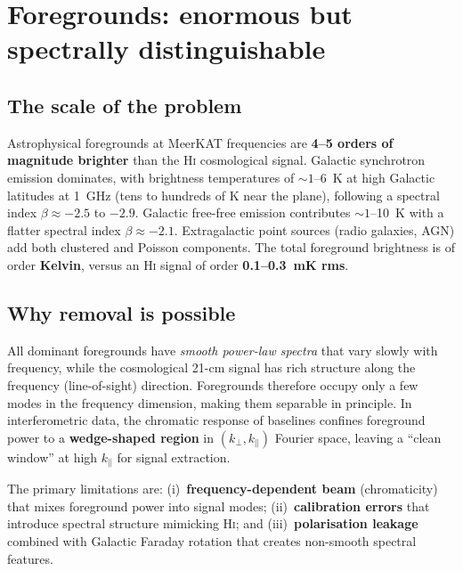 \documentclass[10pt,a4paper]{article}
\begin{document}
\section{Foregrounds: enormous but spectrally distinguishable}
\label{sec:foregrounds}

\subsection{The scale of the problem}

Astrophysical foregrounds at MeerKAT frequencies are \textbf{4--5 orders of
magnitude brighter} than the H\textsc{i} cosmological signal.  Galactic
synchrotron emission dominates, with brightness temperatures of $\sim\!1$--6~K
at high Galactic latitudes at 1~GHz (tens to hundreds of K near the plane),
following a spectral index $\beta \approx -2.5$ to $-2.9$.  Galactic free-free
emission contributes $\sim\!1$--10~K with a flatter spectral index
$\beta \approx -2.1$.  Extragalactic point sources (radio galaxies, AGN) add
both clustered and Poisson components.  The total foreground brightness is of
order \textbf{Kelvin}, versus an H\textsc{i} signal of order
\textbf{0.1--0.3~mK rms}.


\subsection{Why removal is possible}

All dominant foregrounds have \emph{smooth power-law spectra} that vary slowly
with frequency, while the cosmological 21-cm signal has rich structure along
the frequency (line-of-sight) direction.  Foregrounds therefore occupy only a
few modes in the frequency dimension, making them separable in principle.  In
interferometric data, the chromatic response of baselines confines foreground
power to a \textbf{wedge-shaped region} in $(k_\perp, k_\parallel)$ Fourier
space, leaving a ``clean window'' at high $k_\parallel$ for signal extraction.

The primary limitations are: (i)~\textbf{frequency-dependent beam}
(chromaticity) that mixes foreground power into signal modes;
(ii)~\textbf{calibration errors} that introduce spectral structure mimicking
H\textsc{i}; and (iii)~\textbf{polarisation leakage} combined with Galactic
Faraday rotation that creates non-smooth spectral features.
\end{document}
